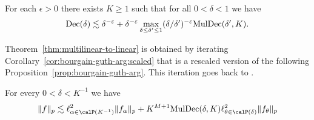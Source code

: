 \begin{theorem}
\label{thm:multilinear-to-linear}
For each $\epsilon>0$ there exists $K\geq 1$ such that for all $0 < \delta < 1$ we have
\begin{equation}
\mathrm{Dec}(\delta)
\lesssim
\delta^{-\varepsilon}
+ \delta^{-\varepsilon} \max_{\delta\le \delta'\le 1}(\delta/\delta')^{-\varepsilon} \mathrm{MulDec}(\delta', K).
\end{equation}
\end{theorem}
Theorem~\ref{thm:multilinear-to-linear} is obtained by iterating Corollary~\ref{cor:bourgain-guth-arg:scaled} that is a rescaled version of the following Proposition~\ref{prop:bourgain-guth-arg}.
This iteration goes back to \cite{MR2860188}.
\begin{proposition}
\label{prop:bourgain-guth-arg}
For every $0<\delta<K^{-1}$ we have
\begin{equation}
\label{eq:BG-arg}
\norm{f}_{p}
\lesssim
\ell^{2}_{\alpha\in \Part{K^{-1}}} \norm{ f_{\alpha} }_{p}
+ K^{M+1} \MulDec(\delta, K) \ell^{2}_{\theta \in \Part{\delta}} \norm{ f_{\theta} }_{p}
\end{equation}
\end{proposition}
